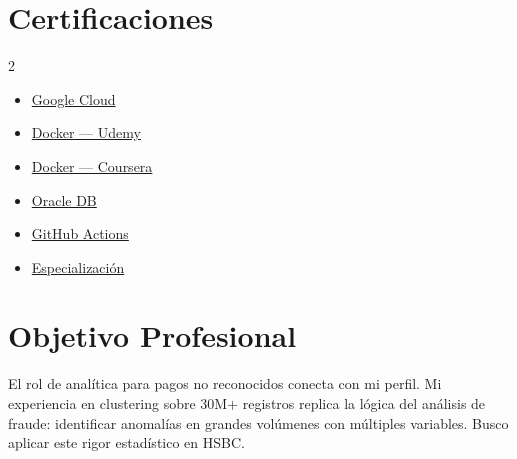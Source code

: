 \documentclass[9.5pt, letterpaper]{article}
\begin{document}
\vspace{-2pt}
\begin{minipage}[t]{0.46\textwidth}
\section{Certificaciones}
{\footnotesize
\begin{multicols}{2}
\begin{itemize}[leftmargin=1.1em, itemsep=0pt, topsep=0pt, parsep=0pt]
  \item \href{https://dvillagrans.dev/about#google-cloud}{Google Cloud \color{accent}\faExternalLink*}
  \item \href{https://dvillagrans.dev/about#docker-udemy}{Docker --- Udemy \color{accent}\faExternalLink*}
  \item \href{https://dvillagrans.dev/about#docker-coursera}{Docker --- Coursera \color{accent}\faExternalLink*}
  \item \href{https://dvillagrans.dev/about#oracle-database}{Oracle DB \color{accent}\faExternalLink*}
  \item \href{https://dvillagrans.dev/about#github-actions}{GitHub Actions \color{accent}\faExternalLink*}
  \item \href{https://dvillagrans.dev/about#coursera-specialization}{Especializaci\'on \color{accent}\faExternalLink*}
\end{itemize}
\end{multicols}
}
\end{minipage}
\hfill
\begin{minipage}[t]{0.50\textwidth}
\section{Objetivo Profesional}
{\small\color{textdark}
El rol de anal\'itica para pagos no reconocidos conecta con mi perfil. Mi experiencia
en clustering sobre 30M+ registros replica la l\'ogica del an\'alisis de fraude:
identificar anomal\'ias en grandes vol\'umenes con m\'ultiples variables.
Busco aplicar este rigor estad\'istico en HSBC.
}
\end{minipage}
\end{document}
